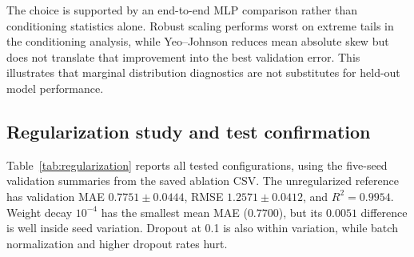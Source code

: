 \documentclass[conference]{IEEEtran}
\begin{document}
The choice is supported by an end-to-end MLP comparison rather than conditioning statistics alone. Robust scaling performs worst on extreme tails in the conditioning analysis, while Yeo--Johnson reduces mean absolute skew but does not translate that improvement into the best validation error. This illustrates that marginal distribution diagnostics are not substitutes for held-out model performance.

\subsection{Regularization study and test confirmation}
Table~\ref{tab:regularization} reports all tested configurations, using the five-seed validation summaries from the saved ablation CSV. The unregularized reference has validation MAE $0.7751\pm0.0444$, RMSE $1.2571\pm0.0412$, and $R^2=0.9954$. Weight decay $10^{-4}$ has the smallest mean MAE ($0.7700$), but its $0.0051$ difference is well inside seed variation. Dropout at 0.1 is also within variation, while batch normalization and higher dropout rates hurt.

\begin{table}[!t]
\centering
\caption{Five-seed regularization ablation on a 200,000-row training subset. Values are validation mean $\pm$ standard deviation.}
\label{tab:regularization}
\end{table}
\end{document}
